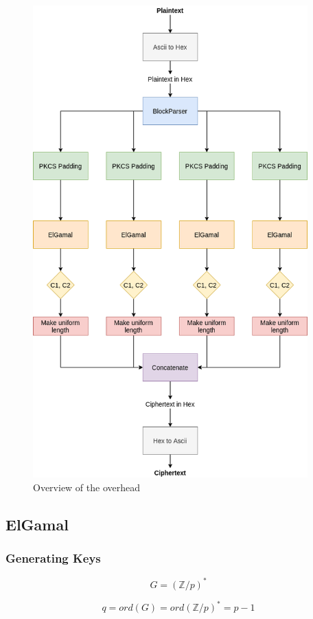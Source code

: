\documentclass{article}
\begin{document}
\begin{figure}[H]
 \centering
  \includegraphics[width=300pt]{img/overview.png}
 \caption{Overview of the overhead}
 \label{rOVERHEAD}
 \end{figure}


\subsection{ElGamal}

\subsubsection{Generating Keys}
\begin{equation}
G = (\mathbb{Z}/p)^{*}
\end{equation}

\begin{equation}
q = ord(G) = ord(\mathbb{Z}/p)^{*} = p-1
\end{equation}
\end{document}
